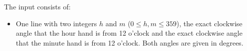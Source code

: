 
    The input consists of:
    \begin{itemize}
        \item One line with two integers $h$ and $m$ ($0 \leq h, m \leq 359$),
            the exact clockwise angle that the hour hand is from 12 o'clock and
            the exact clockwise angle that the minute hand is from 12 o'clock.
            Both angles are given in degrees.
    \end{itemize}
